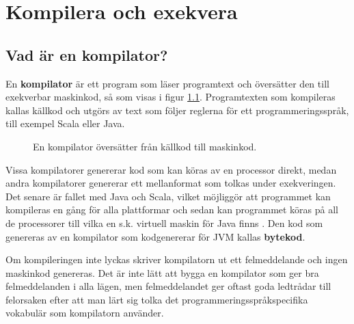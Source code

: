 
\chapter{Kompilera och exekvera}\label{appendix:compile}

\section{Vad är en kompilator?}

En \textbf{kompilator}  är ett program som läser programtext och översätter den till exekverbar maskinkod, så som visas i figur \ref{fig:appendix:compiler}. Programtexten som kompileras kallas källkod och utgörs av text som följer reglerna för ett programmeringsspråk, till exempel Scala eller Java. 

\begin{figure}[H]
\centering
{}
    \caption{En kompilator översätter från källkod till maskinkod.}
    \label{fig:appendix:compiler}
\end{figure}




Vissa kompilatorer genererar kod som kan köras av en processor direkt, medan andra kompilatorer genererar ett mellanformat som tolkas under exekveringen. Det senare är fallet med Java och Scala, vilket möjliggör att programmet kan kompileras en gång för alla plattformar och sedan kan programmet köras på all de processorer till vilka en s.k. virtuell maskin för Java finns . Den kod som genereras av en kompilator som kodgenererar för JVM kallas \textbf{bytekod}.

Om kompileringen inte lyckas skriver kompilatorn ut ett felmeddelande och ingen maskinkod genereras. Det är inte lätt att bygga en kompilator som ger bra felmeddelanden i alla lägen, men felmeddelandet ger oftast goda ledtrådar till felorsaken efter att man lärt sig tolka det programmeringsspråkspecifika vokabulär som kompilatorn använder.

